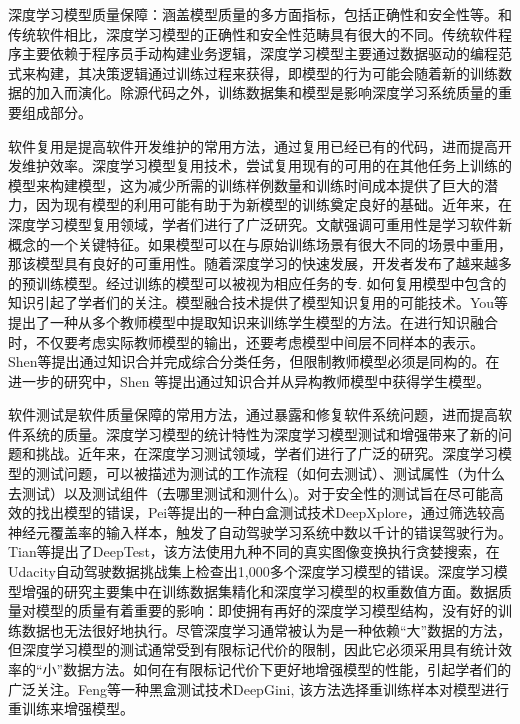 \documentclass[fontset=macnew,UTF8]{article} %
\begin{document}
深度学习模型质量保障：涵盖模型质量的多方面指标，包括正确性和安全性等\cite{landscapes}。和传统软件相比，深度学习模型的正确性和安全性范畴具有很大的不同。传统软件程序主要依赖于程序员手动构建业务逻辑，深度学习模型主要通过数据驱动的编程范式来构建，其决策逻辑通过训练过程来获得，即模型的行为可能会随着新的训练数据的加入而演化\cite{amershi2019software}。除源代码之外，训练数据集和模型是影响深度学习系统质量的重要组成部分。

软件复用是提高软件开发维护的常用方法，通过复用已经已有的代码，进而提高开发维护效率\cite{poulin1996measuring}。深度学习模型复用技术，尝试复用现有的可用的在其他任务上训练的模型来构建模型，这为减少所需的训练样例数量和训练时间成本提供了巨大的潜力，因为现有模型的利用可能有助于为新模型的训练奠定良好的基础。近年来，在深度学习模型复用领域，学者们进行了广泛研究。文献\cite{zhou2016learnware}强调可重用性是学习软件新概念的一个关键特征。如果模型可以在与原始训练场景有很大不同的场景中重用，那该模型具有良好的可重用性。随着深度学习的快速发展，开发者发布了越来越多的预训练模型。经过训练的模型可以被视为相应任务的专\cite{yang2017deep}. 如何复用模型中包含的知识引起了学者们的关注。模型融合技术提供了模型知识复用的可能技术。You等\cite{you2017learning}提出了一种从多个教师模型中提取知识来训练学生模型的方法。在进行知识融合时，不仅要考虑实际教师模型的输出，还要考虑模型中间层不同样本的表示。Shen等\cite{shen2019amalgamating}提出通过知识合并完成综合分类任务，但限制教师模型必须是同构的。在进一步的研究中，Shen 等\cite{shen2019customizing}提出通过知识合并从异构教师模型中获得学生模型。

软件测试是软件质量保障的常用方法，通过暴露和修复软件系统问题，进而提高软件系统的质量\cite{landscapes}。深度学习模型的统计特性为深度学习模型测试和增强带来了新的问题和挑战。近年来，在深度学习测试领域，学者们进行了广泛的研究。深度学习模型的测试问题，可以被描述为测试的工作流程（如何去测试）、测试属性（为什么去测试）以及测试组件（去哪里测试和测什么)。对于安全性的测试旨在尽可能高效的找出模型的错误，Pei等\cite{pei2017deepxplore}提出的一种白盒测试技术DeepXplore，通过筛选较高神经元覆盖率的输入样本，触发了自动驾驶学习系统中数以千计的错误驾驶行为。Tian等\cite{tian2018deeptest}提出了DeepTest，该方法使用九种不同的真实图像变换执行贪婪搜索，在Udacity自动驾驶数据挑战集上检查出1,000多个深度学习模型的错误。深度学习模型增强的研究主要集中在训练数据集精化和深度学习模型的权重数值方面\cite{shen2020mcp}。数据质量对模型的质量有着重要的影响：即使拥有再好的深度学习模型结构，没有好的训练数据也无法很好地执行。尽管深度学习通常被认为是一种依赖“大”数据的方法，但深度学习模型的测试通常受到有限标记代价的限制，因此它必须采用具有统计效率的“小”数据方法\cite{Boosting}。如何在有限标记代价下更好地增强模型的性能，引起学者们的广泛关注。Feng等\cite{feng2020deepgini}一种黑盒测试技术DeepGini, 该方法选择重训练样本对模型进行重训练来增强模型。
\end{document}
